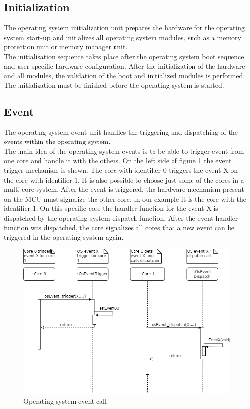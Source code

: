 \subsection{Initialization}
The operating system initialization unit prepares the hardware for the operating system start-up and initializes all operating system modules, such as a memory protection unit or memory manager unit. \\
\indent The initialization sequence takes place after the operating system boot sequence and user-specific hardware configuration. After the initialization of the hardware and all modules, the validation of the boot and initialized modules is performed.\\
\indent The initialization must be finished before the operating system is started.

\subsection{Event}
The operating system event unit handles the triggering and dispatching of the events within the operating system. \\
\indent The main idea of the operating system events is to be able to trigger event from one core and handle it with the others. On the left side of figure \ref{fig:osEvent} the event trigger mechanism is shown. The core with identifier 0 triggers the event X on the core with identifier 1. It is also possible to choose just some of the cores in a multi-core system. After the event is triggered, the hardware mechanism present on the \ac{MCU} must signalize the other core. In our example it is the core with the identifier 1. On this specific core the handler function for the event X is dispatched by the operating system dispatch function. After the event handler function was dispatched, the core signalizes all cores that a new event can be triggered in the operating system again.
\begin{figure}[H]
\begin{center}
\includegraphics[width=1\textwidth]{images/events_example.png}
\caption{Operating system event call}
\label{fig:osEvent}
\end{center}
\end{figure}
